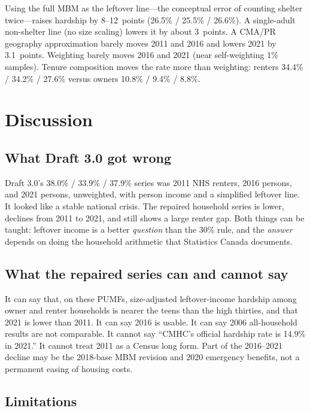 \documentclass[11pt,letterpaper]{article}
\begin{document}
Using the full MBM as the leftover line---the conceptual error of counting shelter twice---raises hardship by 8--12~points (26.5\% / 25.5\% / 26.6\%).
A single-adult non-shelter line (no size scaling) lowers it by about 3~points.
A CMA/PR geography approximation barely moves 2011 and 2016 and lowers 2021 by 3.1~points.
Weighting barely moves 2016 and 2021 (near self-weighting 1\% samples).
Tenure composition moves the rate more than weighting: renters 34.4\% / 34.2\% / 27.6\% versus owners 10.8\% / 9.4\% / 8.8\%.

\section{Discussion}
\label{sec:discussion}

\subsection{What Draft 3.0 got wrong}

Draft 3.0's 38.0\% / 33.9\% / 37.9\% series was 2011 NHS renters, 2016 persons, and 2021 persons, unweighted, with person income and a simplified leftover line.
It looked like a stable national crisis.
The repaired household series is lower, declines from 2011 to 2021, and still shows a large renter gap.
Both things can be taught: leftover income is a better \emph{question} than the 30\% rule, and the \emph{answer} depends on doing the household arithmetic that Statistics Canada documents.

\subsection{What the repaired series can and cannot say}

It can say that, on these PUMFs, size-adjusted leftover-income hardship among owner and renter households is nearer the teens than the high thirties, and that 2021 is lower than 2011.
It can say 2016 is usable.
It can say 2006 all-household results are not comparable.
It cannot say ``CMHC's official hardship rate is 14.9\% in 2021.''
It cannot treat 2011 as a Census long form.
Part of the 2016--2021 decline may be the 2018-base MBM revision and 2020 emergency benefits, not a permanent easing of housing costs.

\subsection{Limitations}
\end{document}
